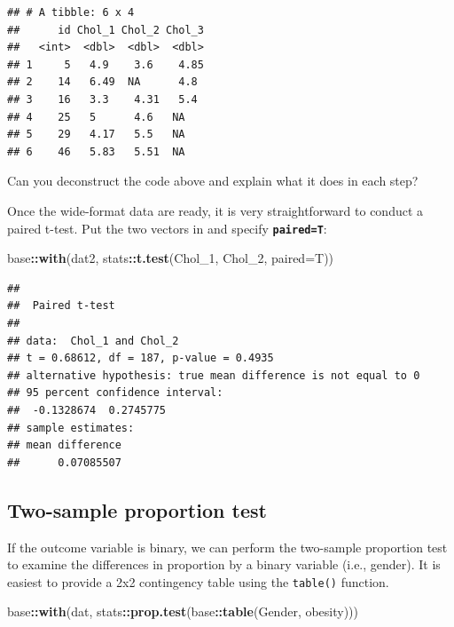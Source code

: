 \documentclass[
]{book}
\newenvironment{Shaded}{\begin{snugshade}}{\end{snugshade}}
\newcommand{\AttributeTok}[1]{\textcolor[rgb]{0.13,0.29,0.53}{#1}}
\newcommand{\FunctionTok}[1]{\textcolor[rgb]{0.13,0.29,0.53}{\textbf{#1}}}
\newcommand{\NormalTok}[1]{#1}
\newcommand{\SpecialCharTok}[1]{\textcolor[rgb]{0.81,0.36,0.00}{\textbf{#1}}}
\begin{document}
\begin{verbatim}
## # A tibble: 6 x 4
##      id Chol_1 Chol_2 Chol_3
##   <int>  <dbl>  <dbl>  <dbl>
## 1     5   4.9    3.6    4.85
## 2    14   6.49  NA      4.8 
## 3    16   3.3    4.31   5.4 
## 4    25   5      4.6   NA   
## 5    29   4.17   5.5   NA   
## 6    46   5.83   5.51  NA
\end{verbatim}

Can you deconstruct the code above and explain what it does in each step?

Once the wide-format data are ready, it is very straightforward to conduct a paired t-test. Put the two vectors in and specify \textbf{\texttt{paired=T}}:

\begin{Shaded}
\begin{Highlighting}[]
\NormalTok{base}\SpecialCharTok{::}\FunctionTok{with}\NormalTok{(dat2, stats}\SpecialCharTok{::}\FunctionTok{t.test}\NormalTok{(Chol\_1, Chol\_2, }\AttributeTok{paired=}\NormalTok{T))}
\end{Highlighting}
\end{Shaded}

\begin{verbatim}
## 
##  Paired t-test
## 
## data:  Chol_1 and Chol_2
## t = 0.68612, df = 187, p-value = 0.4935
## alternative hypothesis: true mean difference is not equal to 0
## 95 percent confidence interval:
##  -0.1328674  0.2745775
## sample estimates:
## mean difference 
##      0.07085507
\end{verbatim}

\subsection{Two-sample proportion test}\label{two-sample-proportion-test}

If the outcome variable is binary, we can perform the two-sample proportion test to examine the differences in proportion by a binary variable (i.e., gender). It is easiest to provide a 2x2 contingency table using the \texttt{table()} function.

\begin{Shaded}
\begin{Highlighting}[]
\NormalTok{base}\SpecialCharTok{::}\FunctionTok{with}\NormalTok{(dat, stats}\SpecialCharTok{::}\FunctionTok{prop.test}\NormalTok{(base}\SpecialCharTok{::}\FunctionTok{table}\NormalTok{(Gender, obesity)))}
\end{Highlighting}
\end{Shaded}
\end{document}
